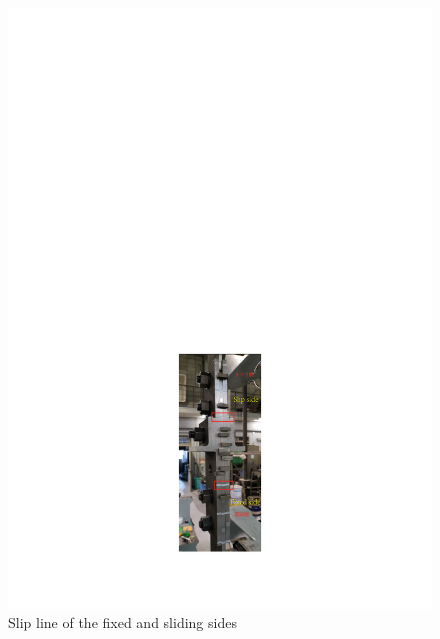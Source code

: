 \begin{figure}[htbp]
\begin{minipage}[t]{0.3\textwidth}
    \includegraphics[width=\linewidth]{imgs/ch3/fig3-28.pdf}
    \caption{Slip line of the fixed and sliding sides}
    \label{fig3-28}
    \end{minipage}
\end{figure} 

